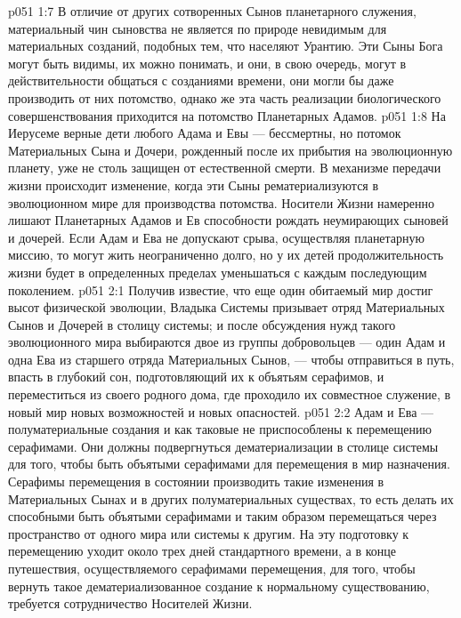 \vs p051 1:7 В отличие от других сотворенных Сынов планетарного служения, материальный чин сыновства не является по природе невидимым для материальных созданий, подобных тем, что населяют Урантию. Эти Сыны Бога могут быть видимы, их можно понимать, и они, в свою очередь, могут в действительности общаться с созданиями времени, они могли бы даже производить от них потомство, однако же эта часть реализации биологического совершенствования приходится на потомство Планетарных Адамов.
\vs p051 1:8 \pc На Иерусеме верные дети любого Адама и Евы --- бессмертны, но потомок Материальных Сына и Дочери, рожденный после их прибытия на эволюционную планету, уже не столь защищен от естественной смерти. В механизме передачи жизни происходит изменение, когда эти Сыны рематериализуются в эволюционном мире для производства потомства. Носители Жизни намеренно лишают Планетарных Адамов и Ев способности рождать неумирающих сыновей и дочерей. Если Адам и Ева не допускают срыва, осуществляя планетарную миссию, то могут жить неограниченно долго, но у их детей продолжительность жизни будет в определенных пределах уменьшаться с каждым последующим поколением.
\vs p051 2:1 Получив известие, что еще один обитаемый мир достиг высот физической эволюции, Владыка Системы призывает отряд Материальных Сынов и Дочерей в столицу системы; и после обсуждения нужд такого эволюционного мира выбираются двое из группы добровольцев --- один Адам и одна Ева из старшего отряда Материальных Сынов, --- чтобы отправиться в путь, впасть в глубокий сон, подготовляющий их к объятьям серафимов, и переместиться из своего родного дома, где проходило их совместное служение, в новый мир новых возможностей и новых опасностей.
\vs p051 2:2 Адам и Ева --- полуматериальные создания и как таковые не приспособлены к перемещению серафимами. Они должны подвергнуться дематериализации в столице системы для того, чтобы быть объятыми серафимами для перемещения в мир назначения. Серафимы перемещения в состоянии производить такие изменения в Материальных Сынах и в других полуматериальных существах, то есть делать их способными быть объятыми серафимами и таким образом перемещаться через пространство от одного мира или системы к другим. На эту подготовку к перемещению уходит около трех дней стандартного времени, а в конце путешествия, осуществляемого серафимами перемещения, для того, чтобы вернуть такое дематериализованное создание к нормальному существованию, требуется сотрудничество Носителей Жизни.
